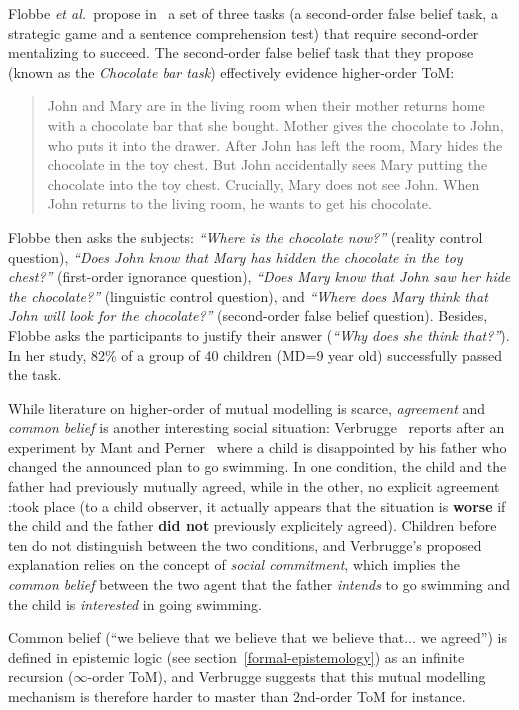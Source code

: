 \documentclass{sig-alternate}
\newcommand{\etal}{{\textit{et al.~}}}
\begin{document}
Flobbe \etal propose in~\cite{flobbe2008children} a set of three tasks (a
second-order false belief task, a strategic game and a sentence comprehension
test) that require second-order mentalizing to succeed. The second-order false
belief task that they propose (known as the \emph{Chocolate bar task})
effectively evidence higher-order ToM:
\begin{quote}
John and Mary are in the living room when their mother returns home with a
chocolate bar that she bought. Mother gives the chocolate to John, who puts it
into the drawer. After John has left the room, Mary hides the chocolate in the
toy chest. But John accidentally sees Mary putting the chocolate into the toy
chest. Crucially, Mary does not see John. When John returns to the living room,
he wants to get his chocolate.
\end{quote}

Flobbe then asks the subjects: \emph{``Where is the chocolate now?''} (reality
control question), \emph{``Does John know that Mary has hidden the chocolate in
the toy chest?''} (first-order ignorance question), \emph{``Does Mary know that
John saw her hide the chocolate?''} (linguistic control question), and
\emph{``Where does Mary think that John will look for the chocolate?''}
(second-order false belief question). Besides, Flobbe asks the participants to
justify their answer (\emph{``Why does she think that?''}). In her study, 82\%
of a group of 40 children (MD=9 year old) successfully passed the task.

While literature on higher-order of mutual modelling is scarce, \emph{agreement}
and \emph{common belief} is another interesting social situation:
Verbrugge~\cite[p.~664]{verbrugge2009logic} reports after an experiment by Mant
and Perner~\cite{mant1988child} where a child is disappointed by his father who
changed the announced plan to go swimming. In one condition, the child and the
father had previously mutually agreed, while in the other, no explicit agreement
:took place (to a child observer, it actually appears that the situation is
\textbf{worse} if the child and the father \textbf{did not} previously
explicitely agreed). Children before ten do not
distinguish between the two conditions, and Verbrugge's proposed explanation
relies on the concept of \emph{social commitment}, which implies
the \emph{common belief} between the two agent that the father \emph{intends} to
go swimming and the child is \emph{interested} in going swimming.

Common belief (``we believe that we believe that we believe that... we agreed'') is
defined in epistemic logic (see section~\ref{formal-epistemology}) as an infinite
recursion ($\infty$-order ToM), and Verbrugge suggests that this mutual
modelling mechanism is therefore harder to master than 2nd-order ToM for
instance.
\end{document}
